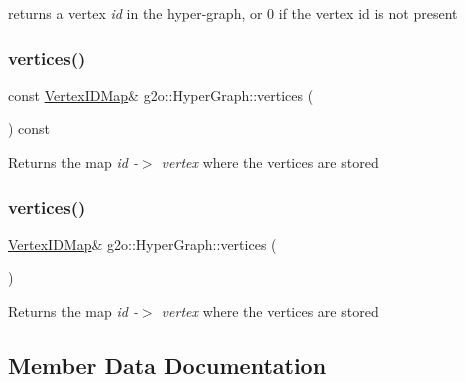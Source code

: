 returns a vertex {\itshape id} in the hyper-\/graph, or 0 if the vertex id is not present 

\mbox{\label{classg2o_1_1_hyper_graph_a95fcf7cd9d89562b2c26d99ede3548ed}} 
\subsubsection{\texorpdfstring{vertices()}{vertices()}\hspace{0.1cm}{\footnotesize\ttfamily [1/2]}}
{\footnotesize\ttfamily const \mbox{\hyperlink{classg2o_1_1_hyper_graph_a97307eac064ebf4b3e2cfbf0718035b5}{Vertex\+I\+D\+Map}}\& g2o\+::\+Hyper\+Graph\+::vertices (\begin{DoxyParamCaption}{ }\end{DoxyParamCaption}) const\hspace{0.3cm}{\ttfamily [inline]}}

\begin{DoxyReturn}{Returns}
the map {\itshape id -\/$>$ vertex} where the vertices are stored 
\end{DoxyReturn}
\mbox{\label{classg2o_1_1_hyper_graph_a650107c875ef6f43d438d7d3e2ddf797}} 
\subsubsection{\texorpdfstring{vertices()}{vertices()}\hspace{0.1cm}{\footnotesize\ttfamily [2/2]}}
{\footnotesize\ttfamily \mbox{\hyperlink{classg2o_1_1_hyper_graph_a97307eac064ebf4b3e2cfbf0718035b5}{Vertex\+I\+D\+Map}}\& g2o\+::\+Hyper\+Graph\+::vertices (\begin{DoxyParamCaption}{ }\end{DoxyParamCaption})\hspace{0.3cm}{\ttfamily [inline]}}

\begin{DoxyReturn}{Returns}
the map {\itshape id -\/$>$ vertex} where the vertices are stored 
\end{DoxyReturn}


\subsection{Member Data Documentation}
\mbox{\label{classg2o_1_1_hyper_graph_afe4ae6e9ef05c8bded2b1b30e1886b36}} 
